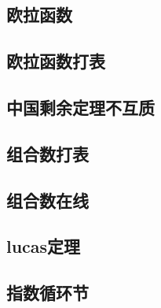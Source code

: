 \subsection{欧拉函数}


\subsection{欧拉函数打表}


\subsection{中国剩余定理不互质}


\subsection{组合数打表}


\subsection{组合数在线}


\subsection{lucas定理}


\subsection{指数循环节}


